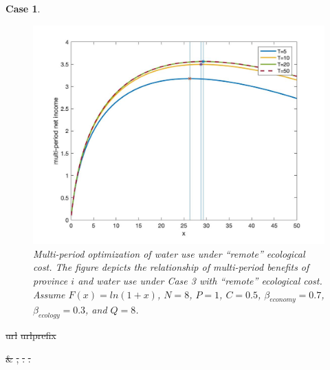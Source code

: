 \documentclass[default, sn-standardnature]{sn-jnl} %
\newtheorem{case_appendix}{Case}
\providecommand{\DIFdeltex}[1]{{\protect\color{red}\sout{#1}}}                      %
\providecommand{\DIFdelbegin}{} %
\providecommand{\DIFdel}[1]{\texorpdfstring{\DIFdeltex{#1}}{}} %
\newcommand{\DIFscaledelfig}{0.5}
\newlength{\DIFdelgraphicswidth} %
\newlength{\DIFdelgraphicsheight} %
\newcommand{\DIFdelincludegraphics}[2][]{%
\sbox{\DIFdelgraphicsbox}{\DIFOincludegraphics[#1]{#2}}%
\settoboxwidth{\DIFdelgraphicswidth}{\DIFdelgraphicsbox} %
\settoboxtotalheight{\DIFdelgraphicsheight}{\DIFdelgraphicsbox} %
\scalebox{\DIFscaledelfig}{%
\parbox[b]{\DIFdelgraphicswidth}{\usebox{\DIFdelgraphicsbox}\\[-\baselineskip] \rule{\DIFdelgraphicswidth}{0em}}\llap{\resizebox{\DIFdelgraphicswidth}{\DIFdelgraphicsheight}{%
\setlength{\unitlength}{\DIFdelgraphicswidth}%
\begin{picture}(1,1)%
\thicklines\linethickness{2pt} %
{\color[rgb]{1,0,0}\put(0,0){\framebox(1,1){}}}%
{\color[rgb]{1,0,0}\put(0,0){\line( 1,1){1}}}%
{\color[rgb]{1,0,0}\put(0,1){\line(1,-1){1}}}%
\end{picture}%
}\hspace*{3pt}}} %
} %
\DeclareRobustCommand{\DIFdelbegin}{\DIFOdelbegin \let\includegraphics\DIFdelincludegraphics} %
\begin{document}
\begin{case_appendix}
\begin{figure}[H]
    \centering
    \includegraphics[width=0.9\linewidth]{outputs/Fig4.jpg}
    \caption{Multi-period optimization of water use under ``remote'' ecological cost. The figure depicts the relationship of multi-period benefits of province $i$ and water use under Case 3 with ``remote'' ecological cost. Assume $F(x)=ln(1+x)$, $N=8$, $P=1$, $C=0.5$, $\beta_{economy}=0.7$, $\beta_{ecology}=0.3$, and $Q=8$.}
    \label{fig:remote}
\end{figure}

\end{case_appendix}


\DIFdelbegin %
\DIFdel{url}%
\DIFdel{urlprefix}%

\DIFdel{\& }%
\textbf{%
}%
\DIFdel{,
  }%
\DIFdel{.
}%
\DIFdel{.
}%
\end{document}
